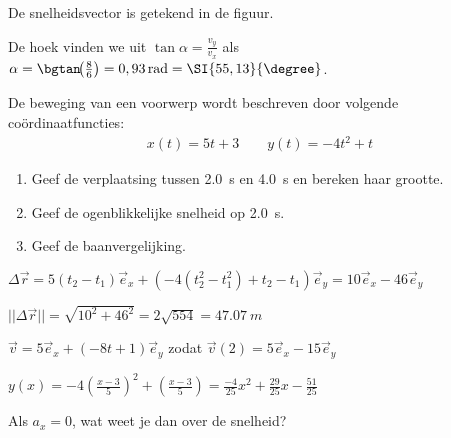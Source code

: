 \documentclass{ximera}
\begin{document}
\begin{exercise}
\begin{oplossing}
De snelheidsvector is getekend in de figuur.

De hoek vinden we uit $\tan\alpha=\frac{v_y}{v_x}$ als $\alpha=\bgtan\!{\left(\frac{8}{6}\right)}=0,93\rm\,rad=\SI{55,13}{\degree}$.
\end{oplossing}
\end{exercise}

\begin{exercise} De beweging van een voorwerp wordt beschreven door volgende coördinaatfuncties:
\begin{eqnarray*}
x(t)=5t+3\qquad y(t)=-4t^2+t
\end{eqnarray*}
\begin{enumerate}
\item Geef de verplaatsing tussen \SI{2,0}{s} en \SI{4,0}{s} en bereken haar grootte.
\item Geef de ogenblikkelijke snelheid op \SI{2,0}{s}.
\item Geef de baanvergelijking.
\end{enumerate}

\begin{oplossing}
$\Delta\vec{r}=5(t_2-t_1)\vec{e}_x+(-4(t_2^2-t_1^2)+t_2-t_1)\vec{e}_y=10\vec{e}_x-46\vec{e}_y$

$||\Delta\vec{r}||=\sqrt{10^2+46^2}=2\sqrt{554}=\SI{47,07}{m}$

$\vec{v}=5\vec{e}_x+(-8t+1)\vec{e}_y$ zodat $\vec{v}(2)=5\vec{e}_x-15\vec{e}_y$

$y(x)=-4\left(\frac{x-3}{5}\right)^2+\left(\frac{x-3}{5}\right)=\frac{-4}{25}x^{2} + \frac{29}{25}x - \frac{51}{25}$

\end{oplossing}
\end{exercise}

\begin{exercise}
	Als $a_x=0$, wat weet je dan over de snelheid?
\end{exercise}
\end{document}
